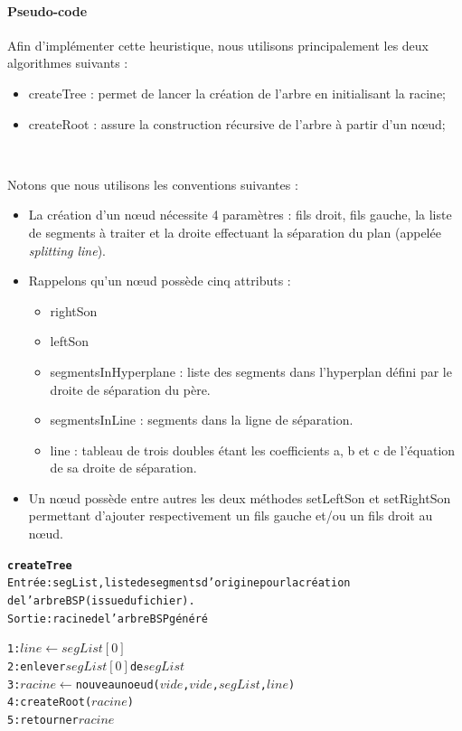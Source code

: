 \documentclass[11pt,a4paper]{article}
\theoremstyle{definition}
\theoremstyle{remark}
\begin{document}
\paragraph{Pseudo-code}

Afin d'implémenter cette heuristique, nous utilisons principalement les deux algorithmes suivants :\\

\begin{itemize}
\item createTree : permet de lancer la création de l'arbre en initialisant la racine;
\item createRoot : assure la construction récursive de l'arbre à partir d'un nœud;
\end{itemize}\\
\bigskip

Notons que nous utilisons les conventions suivantes :\\

\begin{itemize}
\item La création d'un nœud nécessite 4 paramètres : fils droit, fils gauche, la liste de segments à traiter et la droite effectuant la séparation du plan (appelée \emph{splitting line}).
\item Rappelons qu'un nœud possède cinq attributs :
\begin{itemize}
	\item rightSon
	\item leftSon
	\item segmentsInHyperplane : liste des segments dans l'hyperplan défini par le droite de séparation du père.
	\item segmentsInLine : segments dans la ligne de séparation.
	\item line : tableau de trois doubles étant les coefficients a, b et c de l'équation de sa droite de séparation.
\end{itemize}
\item Un nœud possède entre autres les deux méthodes setLeftSon et setRightSon permettant d'ajouter respectivement un fils gauche et/ou un fils droit au nœud. 
\end{itemize}

\newpage

\begin{alltt}
\textbf{createTree}
Entrée : segList, liste de segments d'origine pour la création 
de l'arbre BSP (issue du fichier).
Sortie : racine de l'arbre BSP généré

1: \(line \leftarrow segList[0]\)
2: enlever \(segList[0]\) de \(segList\)
3: \(racine\) \(\leftarrow\) nouveau noeud (\(vide\), \(vide\), \(segList\), \(line\))
4: createRoot(\(racine\))
5: retourner \(racine\)
\end{alltt}
\end{document}

